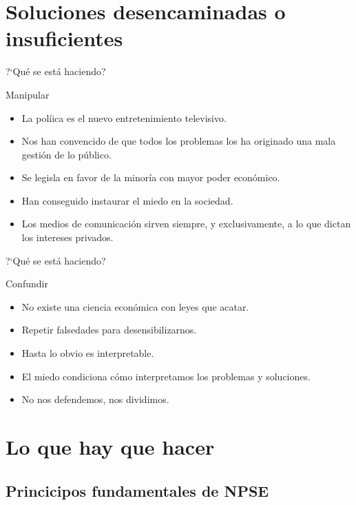 \documentclass{beamer}
\begin{document}
\section{Soluciones desencaminadas o insuficientes}

\begin{frame}{?‘Qu\'e se est\'a haciendo?}
  \begin{block}{Manipular}
  \begin{itemize}
    \item La pol\'i{}ica es el nuevo entretenimiento televisivo.
    \item Nos han convencido de que todos los problemas los ha originado una mala gesti\'on de lo p\'ublico.
    \item Se legisla en favor de la minor\'i{}a con mayor poder econ\'omico.
    \item Han conseguido instaurar el miedo en la sociedad.
    \item Los medios de comunicaci\'on sirven siempre, y exclusivamente, a lo que dictan los intereses privados.
  \end{itemize}
  \end{block}
\end{frame}

\begin{frame}{?‘Qu\'e se est\'a haciendo?}
  \begin{block}{Confundir}
  \begin{itemize}
    \item No existe una ciencia econ\'omica con leyes que acatar.
    \item Repetir falsedades para desensibilizarnos.
    \item Hasta lo obvio es interpretable.
    \item El miedo condiciona c\'omo interpretamos los problemas y soluciones.
    \item No nos defendemos, nos dividimos.
  \end{itemize}
  \end{block}
\end{frame}

\section{Lo que hay que hacer}

\subsection{Princicipos fundamentales de NPSE}
\end{document}
